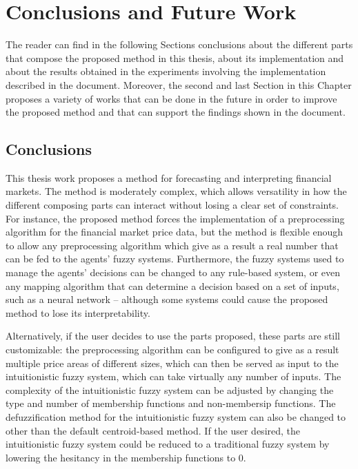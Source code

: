 \chapter{Conclusions and Future Work}
\label{chapter:conclusions-and-future-work}

The reader can find in the following Sections conclusions about the different
parts that compose the proposed method in this thesis, about its implementation
and about the results obtained in the experiments involving the implementation
described in the document. Moreover, the second and last Section in this Chapter
proposes a variety of works that can be done in the future in order to improve
the proposed method and that can support the findings shown in the document.

\section{Conclusions}
\label{section:conclusions}

This thesis work proposes a method for forecasting and interpreting financial
markets. The method is moderately complex, which allows versatility in how the
different composing parts can interact without losing a clear set of
constraints. For instance, the proposed method forces the implementation of a
preprocessing algorithm for the financial market price data, but the method is
flexible enough to allow any preprocessing algorithm which give as a result a
real number that can be fed to the agents' fuzzy systems. Furthermore, the fuzzy
systems used to manage the agents' decisions can be changed to any rule-based
system, or even any mapping algorithm that can determine a decision based on a
set of inputs, such as a neural network -- although some systems could cause the
proposed method to lose its interpretability.

Alternatively, if the user decides to use the parts proposed, these parts are
still customizable: the preprocessing algorithm can be configured to give as a
result multiple price areas of different sizes, which can then be served as
input to the intuitionistic fuzzy system, which can take virtually any number of
inputs. The complexity of the intuitionistic fuzzy system can be adjusted by
changing the type and number of membership functions and non-membersip
functions. The defuzzification method for the intuitionistic fuzzy system can
also be changed to other than the default centroid-based method. If the user
desired, the intuitionistic fuzzy system could be reduced to a traditional fuzzy
system by lowering the hesitancy in the membership functions to 0.

